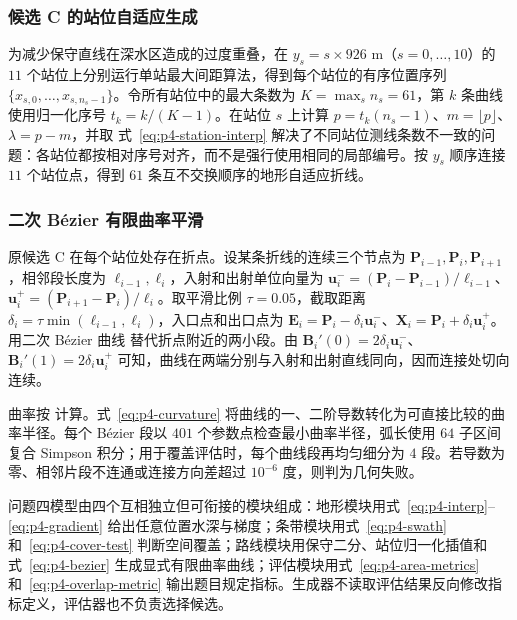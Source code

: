 \subsubsection{候选 C 的站位自适应生成}
为减少保守直线在深水区造成的过度重叠，在 $y_s=s\times926$ m（$s=0,\ldots,10$）的 $11$ 个站位上分别运行单站最大间距算法，得到每个站位的有序位置序列 $\{x_{s,0},\ldots,x_{s,n_s-1}\}$。令所有站位中的最大条数为 $K=\max_s n_s=61$，第 $k$ 条曲线使用归一化序号 $t_k=k/(K-1)$。在站位 $s$ 上计算 $p=t_k(n_s-1)$、$m=\lfloor p\rfloor$、$\lambda=p-m$，并取
式~\eqref{eq:p4-station-interp} 解决了不同站位测线条数不一致的问题：各站位都按相对序号对齐，而不是强行使用相同的局部编号。按 $y_s$ 顺序连接 $11$ 个站位点，得到 $61$ 条互不交换顺序的地形自适应折线。

\subsubsection{二次 Bézier 有限曲率平滑}
原候选 C 在每个站位处存在折点。设某条折线的连续三个节点为 $\bm P_{i-1},\bm P_i,\bm P_{i+1}$，相邻段长度为 $\ell_{i-1},\ell_i$，入射和出射单位向量为 $\bm u_i^-=(\bm P_i-\bm P_{i-1})/\ell_{i-1}$、$\bm u_i^+=(\bm P_{i+1}-\bm P_i)/\ell_i$。取平滑比例 $\tau=0.05$，截取距离 $\delta_i=\tau\min(\ell_{i-1},\ell_i)$，入口点和出口点为 $\bm E_i=\bm P_i-\delta_i\bm u_i^-$、$\bm X_i=\bm P_i+\delta_i\bm u_i^+$。用二次 Bézier 曲线
替代折点附近的两小段。由 $\bm B_i'(0)=2\delta_i\bm u_i^-$、$\bm B_i'(1)=2\delta_i\bm u_i^+$ 可知，曲线在两端分别与入射和出射直线同向，因而连接处切向连续。

曲率按
计算。式~\eqref{eq:p4-curvature} 将曲线的一、二阶导数转化为可直接比较的曲率半径。每个 Bézier 段以 $401$ 个参数点检查最小曲率半径，弧长使用 $64$ 子区间复合 Simpson 积分；用于覆盖评估时，每个曲线段再均匀细分为 $4$ 段。若导数为零、相邻片段不连通或连接方向差超过 $10^{-6}$ 度，则判为几何失败。

\begin{modelsummary}[问题四模型归纳]
问题四模型由四个互相独立但可衔接的模块组成：地形模块用式~\eqref{eq:p4-interp}--\eqref{eq:p4-gradient} 给出任意位置水深与梯度；条带模块用式~\eqref{eq:p4-swath} 和~\eqref{eq:p4-cover-test} 判断空间覆盖；路线模块用保守二分、站位归一化插值和式~\eqref{eq:p4-bezier} 生成显式有限曲率曲线；评估模块用式~\eqref{eq:p4-area-metrics} 和~\eqref{eq:p4-overlap-metric} 输出题目规定指标。生成器不读取评估结果反向修改指标定义，评估器也不负责选择候选。
\end{modelsummary}


